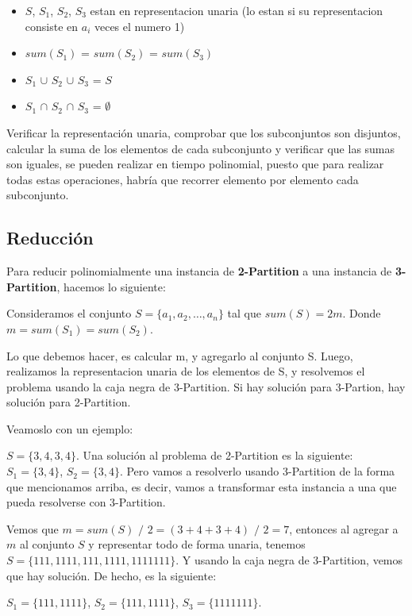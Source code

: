 \begin{itemize}
    \item $S$, $S_1$, $S_2$, $S_3$ estan en representacion unaria (lo estan si su representacion consiste en $a_i$ veces el numero 1)
    \item $sum(S_1)$ = $sum(S_2)$ = $sum(S_3)$
    \item $S_1$ $\cup$ $S_2$ $\cup$ $S_3$ = $S$
    \item $S_1$ $\cap$ $S_2$ $\cap$ $S_3$ = $\emptyset$
\end{itemize}

Verificar la representación unaria, comprobar que los subconjuntos son disjuntos, calcular la suma de los elementos de cada subconjunto y verificar que las sumas son iguales, se pueden realizar en tiempo polinomial, puesto que para realizar todas estas operaciones, habría que recorrer elemento por elemento cada subconjunto.

\subsection*{Reducción}

Para reducir polinomialmente una instancia de \textbf{2-Partition} a una instancia de \textbf{3-Partition}, hacemos lo siguiente:

Consideramos el conjunto \( S = \{a_1, a_2, \dots, a_n\} \) tal que $sum(S) = 2m$. Donde $m = sum(S_1) = sum(S_2)$.

Lo que debemos hacer, es calcular m, y agregarlo al conjunto S. Luego, realizamos la representacion unaria de los elementos de S, y resolvemos el problema usando la caja negra de 3-Partition. Si hay solución para 3-Partion, hay solución para 2-Partition.

Veamoslo con un ejemplo:

$S = \{3, 4, 3, 4\}$. Una solución al problema de 2-Partition es la siguiente: $S_1 = \{3, 4\}$, $S_2 = \{3, 4\}$. Pero vamos a resolverlo usando 3-Partition de la forma que mencionamos arriba, es decir, vamos a transformar esta instancia a una que pueda resolverse con 3-Partition.

Vemos que $m = sum(S)$ $/$ $2 = (3 + 4 + 3 + 4)$ $/$ $2 = 7$, entonces al agregar a $m$ al conjunto $S$ y representar todo de forma unaria, tenemos $S = \{111, 1111, 111, 1111, 1111111\}$. Y usando la caja negra de 3-Partition, vemos que hay solución. De hecho, es la siguiente:

$S_1 = \{111, 1111\}$, $S_2 = \{111, 1111\}$, $S_3 = \{1111111\}$.

